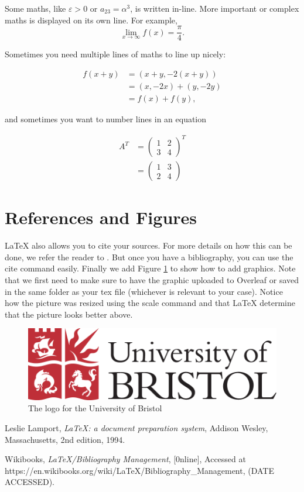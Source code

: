 \documentclass[a4paper,11pt]{article}
\theoremstyle{definition}
\begin{document}
Some maths, like $\varepsilon>0$ or $a_{23}=\alpha^3$, is written in-line. More important or complex maths is displayed on its own line.
For example, $$ \lim_{x\to\infty}f(x)=\frac{\pi}{4}.$$

Sometimes you need multiple lines of maths to line up nicely:

\begin{align*}
f(x+y)&=(x+y,-2(x+y))\\
&=(x,-2x)+(y,-2y)\\
&=f(x)+f(y),
\end{align*}

and sometimes you want to number lines in an equation

\begin{align}
A^{T} & =\begin{pmatrix}1 & 2\\
3 & 4
\end{pmatrix}^{T}\\
\label{my_eqn}  & =\begin{pmatrix}1 & 3\\
2 & 4
\end{pmatrix}
\end{align}

\section{References and Figures}
\LaTeX{} \cite{lamport94} also allows you to cite your sources. For more details on how this can be done, we refer the reader to \cite[sec:~Embedded System]{referencing}. But once you have a bibliography, you can use the cite command easily. Finally we add Figure \ref{fig:logo} to show how to add graphics. Note that we first need to make sure to have the graphic uploaded to Overleaf or saved in the same folder as your tex file (whichever is relevant to your case). Notice how the picture was resized using the scale command and that \LaTeX{} determine that the picture looks better above.

\begin{figure}
    \centering
    \includegraphics[scale=0.3]{logo-full-colour.png}
    \caption{The logo for the University of Bristol}
    \label{fig:logo}
\end{figure}


\begin{thebibliography}{99}

  Leslie Lamport,
  \textit{\LaTeX: a document preparation system},
  Addison Wesley, Massachusetts,
  2nd edition,
  1994.
  
    Wikibooks,
    \textit{LaTeX/Bibliography Management},
    [0nline],
    Accessed at https://en.wikibooks.org/wiki/LaTeX/Bibliography\_Management,
    (DATE ACCESSED).
    

\end{thebibliography}
\end{document}
